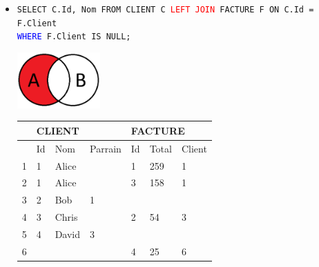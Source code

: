 \documentclass[a4paper]{article}
\begin{document}
\begin{itemize}
\begin{itemize}
    \item \texttt{SELECT C.Id, Nom FROM CLIENT C \textcolor{red}{LEFT JOIN} FACTURE F ON C.Id = F.Client} \\ \texttt{\textcolor{blue}{WHERE} F.Client IS NULL;}
    \begin{center}
        \includegraphics[width=0.25\textwidth]{../images/left-join-02.PNG}
    \end{center}
    \begin{center}
        \begin{tabular}{|l|l|l|l|l|l|l|} \hline
            & \multicolumn{3}{l|}{CLIENT} & \multicolumn{3}{l|}{FACTURE} \\ \hline
            & Id & Nom & Parrain & Id & Total & Client \\ \hline
            1 & 1 & Alice &   & 1 & 259 & 1 \\ \hline
            2 & 1 & Alice &   & 3 & 158 & 1 \\ \hline
            \rowcolor{orange!30}
            3 & 2 &   Bob & 1 &   &     &   \\ \hline
            4 & 3 & Chris &   & 2 &  54 & 3 \\ \hline
            \rowcolor{orange!30}
            5 & 4 & David & 3 &   &     &   \\ \hline
            6 &   &       &   & 4 &  25 & 6 \\ \hline
        \end{tabular}
    \end{center}



\end{itemize}
\end{itemize}
\end{document}
